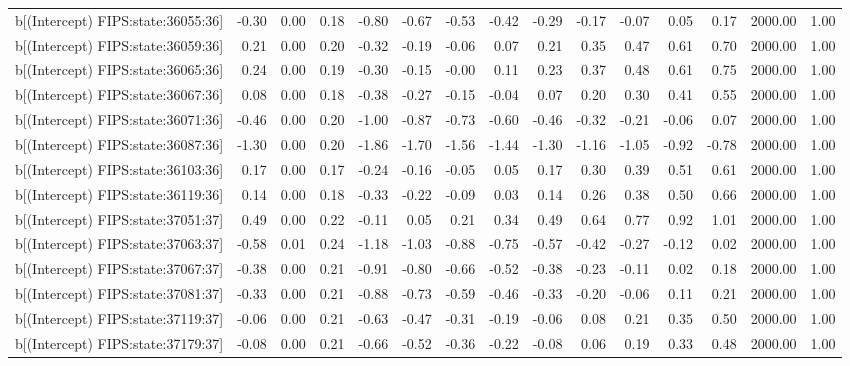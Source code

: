 \begin{table}[ht]
\begin{tabular}{rrrrrrrrrrrrrrr}
  b[(Intercept) FIPS:state:36055:36] & -0.30 & 0.00 & 0.18 & -0.80 & -0.67 & -0.53 & -0.42 & -0.29 & -0.17 & -0.07 & 0.05 & 0.17 & 2000.00 & 1.00 \\ 
  b[(Intercept) FIPS:state:36059:36] & 0.21 & 0.00 & 0.20 & -0.32 & -0.19 & -0.06 & 0.07 & 0.21 & 0.35 & 0.47 & 0.61 & 0.70 & 2000.00 & 1.00 \\ 
  b[(Intercept) FIPS:state:36065:36] & 0.24 & 0.00 & 0.19 & -0.30 & -0.15 & -0.00 & 0.11 & 0.23 & 0.37 & 0.48 & 0.61 & 0.75 & 2000.00 & 1.00 \\ 
  b[(Intercept) FIPS:state:36067:36] & 0.08 & 0.00 & 0.18 & -0.38 & -0.27 & -0.15 & -0.04 & 0.07 & 0.20 & 0.30 & 0.41 & 0.55 & 2000.00 & 1.00 \\ 
  b[(Intercept) FIPS:state:36071:36] & -0.46 & 0.00 & 0.20 & -1.00 & -0.87 & -0.73 & -0.60 & -0.46 & -0.32 & -0.21 & -0.06 & 0.07 & 2000.00 & 1.00 \\ 
  b[(Intercept) FIPS:state:36087:36] & -1.30 & 0.00 & 0.20 & -1.86 & -1.70 & -1.56 & -1.44 & -1.30 & -1.16 & -1.05 & -0.92 & -0.78 & 2000.00 & 1.00 \\ 
  b[(Intercept) FIPS:state:36103:36] & 0.17 & 0.00 & 0.17 & -0.24 & -0.16 & -0.05 & 0.05 & 0.17 & 0.30 & 0.39 & 0.51 & 0.61 & 2000.00 & 1.00 \\ 
  b[(Intercept) FIPS:state:36119:36] & 0.14 & 0.00 & 0.18 & -0.33 & -0.22 & -0.09 & 0.03 & 0.14 & 0.26 & 0.38 & 0.50 & 0.66 & 2000.00 & 1.00 \\ 
  b[(Intercept) FIPS:state:37051:37] & 0.49 & 0.00 & 0.22 & -0.11 & 0.05 & 0.21 & 0.34 & 0.49 & 0.64 & 0.77 & 0.92 & 1.01 & 2000.00 & 1.00 \\ 
  b[(Intercept) FIPS:state:37063:37] & -0.58 & 0.01 & 0.24 & -1.18 & -1.03 & -0.88 & -0.75 & -0.57 & -0.42 & -0.27 & -0.12 & 0.02 & 2000.00 & 1.00 \\ 
  b[(Intercept) FIPS:state:37067:37] & -0.38 & 0.00 & 0.21 & -0.91 & -0.80 & -0.66 & -0.52 & -0.38 & -0.23 & -0.11 & 0.02 & 0.18 & 2000.00 & 1.00 \\ 
  b[(Intercept) FIPS:state:37081:37] & -0.33 & 0.00 & 0.21 & -0.88 & -0.73 & -0.59 & -0.46 & -0.33 & -0.20 & -0.06 & 0.11 & 0.21 & 2000.00 & 1.00 \\ 
  b[(Intercept) FIPS:state:37119:37] & -0.06 & 0.00 & 0.21 & -0.63 & -0.47 & -0.31 & -0.19 & -0.06 & 0.08 & 0.21 & 0.35 & 0.50 & 2000.00 & 1.00 \\ 
  b[(Intercept) FIPS:state:37179:37] & -0.08 & 0.00 & 0.21 & -0.66 & -0.52 & -0.36 & -0.22 & -0.08 & 0.06 & 0.19 & 0.33 & 0.48 & 2000.00 & 1.00 \\ 

\end{tabular}
\end{table}
